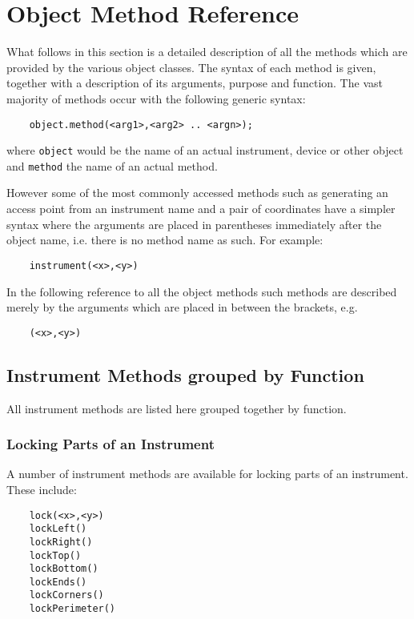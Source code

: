 \chapter{Object Method Reference}
\label{section:object_method_reference}
What follows in this section is a detailed description of all the
methods which are provided by the various object classes. The syntax
of each method is given, together with a description of its arguments,
purpose and function. The vast majority of methods occur with the
following generic syntax:

\begin{verbatim}
    object.method(<arg1>,<arg2> .. <argn>);
\end{verbatim}

where \verb|object| would be the name of an actual instrument, device or
other object and \verb|method| the name of an actual method.

However some of the most commonly accessed methods such as generating
an access point from an instrument name and a pair of coordinates have
a simpler syntax where the arguments are placed in parentheses immediately
after the object name, i.e. there is no method name as such. For example:

\begin{verbatim}
    instrument(<x>,<y>)
\end{verbatim}

In the following reference to all the object methods such methods
are described merely by the arguments which are placed in between
the brackets, e.g.

\begin{verbatim}
    (<x>,<y>)
\end{verbatim}

\section{Instrument Methods grouped by Function}
All instrument methods are listed here grouped together by function.

\subsection{Locking Parts of an Instrument}
A number of instrument methods are available for locking parts of an
instrument. These include:

\begin{verbatim}
    lock(<x>,<y>)
    lockLeft()
    lockRight()
    lockTop()
    lockBottom()
    lockEnds()
    lockCorners()
    lockPerimeter()
\end{verbatim}

